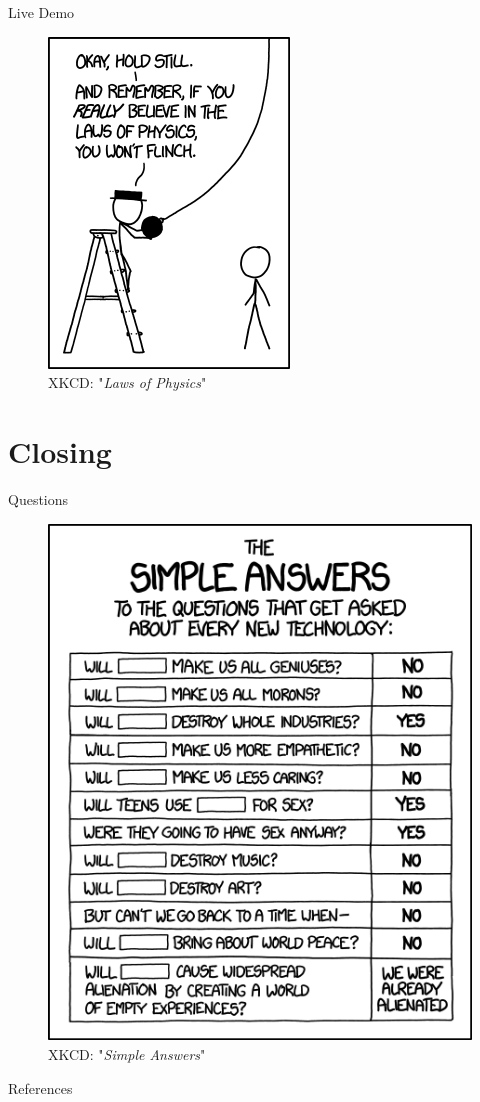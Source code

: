\documentclass{beamer}
\begin{document}
\begin{frame}{Live Demo}
	\begin{figure}
		\includegraphics[width=.35\textwidth]{../Images/xkcd_laws_of_physics.png}
		\caption{XKCD: "\textit{Laws of Physics}" \cite{xkcd-laws-of-physics}}
	\end{figure}
\end{frame}

\section{Closing}

\begin{frame}{Questions}
	\begin{figure}
		\includegraphics[width=.4\textwidth]{../Images/xkcd_simple_answers.png}
		\caption{XKCD: "\textit{Simple Answers}" \cite{xkcd-simple-answers}}
	\end{figure}
\end{frame}

\begin{frame}[allowframebreaks]{References}
\printbibliography
\end{frame}
\end{document}
